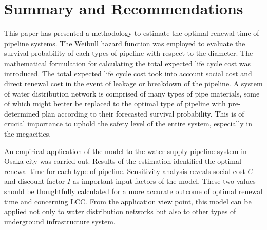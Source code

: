 \documentclass[a4paper,oneside,onecolumn,preprint,10pt,authoryear]{elsarticle}
\begin{document}
\section{Summary and Recommendations}
\label{59}
This paper has presented a methodology to estimate the optimal renewal time of pipeline systems. The Weibull hazard function was employed to evaluate the survival probability of each types of pipeline with respect to the diameter. The mathematical formulation for calculating the total expected life cycle cost was introduced. The total expected life cycle cost took into account social cost and direct renewal cost in the event of leakage or breakdown of the pipeline. A system of water distribution network is comprised of many types of pipe materials, some of which might better be replaced to the optimal type of pipeline with pre-determined plan according to their forecasted survival probability. This is of crucial importance to uphold the safety level of the entire system, especially in the megacities. 

An empirical application of the model to the water supply pipeline system in Osaka city was carried out. Results of the estimation identified the optimal renewal time for each type of pipeline. Sensitivity analysis reveals social cost $C$ and discount factor $I$ as important input factors of the model. These two values should be thoughtfully calculated for a more accurate outcome of optimal renewal time and concerning LCC. From the application view point, this model can be applied not only to water distribution networks but also to other types of underground infrastructure system.%




 

\end{document}
